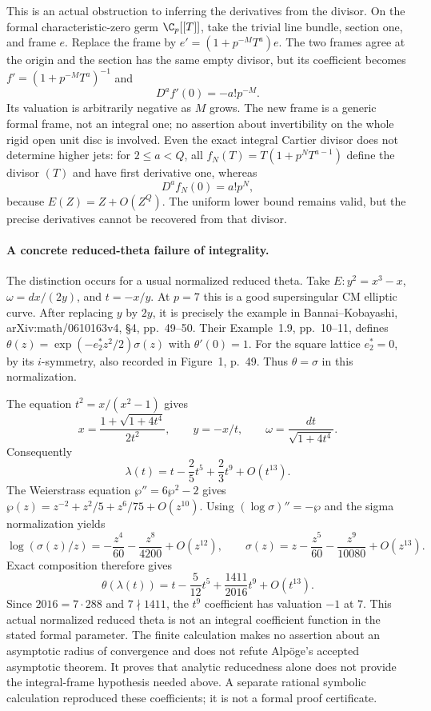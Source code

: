 \documentclass[11pt]{article}
\theoremstyle{definition}\newtheorem{definition}[theorem]{Definition}\newtheorem{remark}[theorem]{Remark}
\begin{document}
This is an actual obstruction to inferring the derivatives from
the divisor. On the formal characteristic-zero germ
$\C_p[[T]]$, take the trivial line bundle, section one, and frame
$e$. Replace the frame by
$e'=(1+p^{-M}T^a)e$. The two frames agree at the origin and the
section has the same empty divisor, but its coefficient becomes
$f'=(1+p^{-M}T^a)^{-1}$ and
\[
 D^af'(0)=-a!p^{-M}.
\]
Its valuation is arbitrarily negative as $M$ grows. The new frame
is a generic formal frame, not an integral one; no assertion about
invertibility on the whole rigid open unit disc is involved.
Even the exact integral Cartier divisor does not determine higher
jets: for $2\leq a<Q$, all
$f_N(T)=T(1+p^NT^{a-1})$ define the divisor $(T)$ and have first
derivative one, whereas
\[
 D^af_N(0)=a!p^N,
\]
because $E(Z)=Z+O(Z^Q)$. The uniform lower bound remains valid,
but the precise derivatives cannot be recovered from that divisor.

\paragraph{A concrete reduced-theta failure of integrality.}
The distinction occurs for a usual normalized reduced theta.
Take $E:y^2=x^3-x$, $\omega=dx/(2y)$, and $t=-x/y$.
At $p=7$ this is a good supersingular CM elliptic curve.
After replacing $y$ by $2y$, it is precisely the example in
Bannai--Kobayashi, arXiv:math/0610163v4, \S4, pp.~49--50.
Their Example~1.9, pp.~10--11, defines
$\theta(z)=\exp(-e_2^*z^2/2)\sigma(z)$ with $\theta'(0)=1$.
For the square lattice $e_2^*=0$, by its $i$-symmetry, also recorded
in Figure~1, p.~49. Thus $\theta=\sigma$ in this normalization.

The equation $t^2=x/(x^2-1)$ gives
\[
 x=\frac{1+\sqrt{1+4t^4}}{2t^2},\qquad y=-x/t,
 \qquad \omega=\frac{dt}{\sqrt{1+4t^4}}.
\]
Consequently
\[
 \lambda(t)=t-\frac25t^5+\frac23t^9+O(t^{13}).
\]
The Weierstrass equation $\wp''=6\wp^2-2$ gives
$\wp(z)=z^{-2}+z^2/5+z^6/75+O(z^{10})$.
Using $(\log\sigma)''=-\wp$ and the sigma normalization yields
\[
 \log(\sigma(z)/z)=-\frac{z^4}{60}-\frac{z^8}{4200}+O(z^{12}),
 \qquad
 \sigma(z)=z-\frac{z^5}{60}-\frac{z^9}{10080}+O(z^{13}).
\]
Exact composition therefore gives
\[
 \theta(\lambda(t))
 =t-\frac5{12}t^5+\frac{1411}{2016}t^9+O(t^{13}).
\]
Since $2016=7\cdot288$ and $7\nmid1411$, the $t^9$ coefficient
has valuation $-1$ at $7$. This actual normalized reduced theta is
not an integral coefficient function in the stated formal
parameter. The finite calculation makes no assertion about an
asymptotic radius of convergence and does not refute Alp\"oge's
accepted asymptotic theorem. It proves that analytic reducedness
alone does not provide the integral-frame hypothesis needed above.
A separate rational symbolic calculation reproduced these
coefficients; it is not a formal proof certificate.
\end{document}
